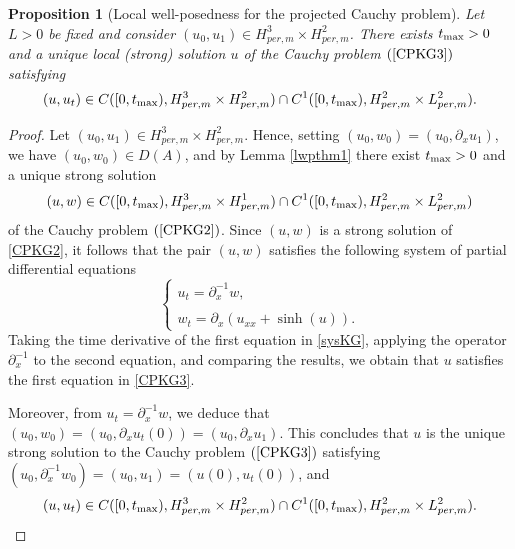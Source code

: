 \documentclass[12pt,reqno,a4paper]{amsart} %
\numberwithin{equation}{section}
\numberwithin{figure}{section}
\newtheorem{proposition}[theorem]{Proposition}
\begin{document}
\begin{proposition}[Local well-posedness for the projected Cauchy problem]\label{lwpthm}
	Let $L>0$ be fixed and consider   $(u_0,u_1)\in H_{per,m}^3\times H_{per,m}^2$. There exists $t_{\rm{max}}>0$ and a unique  local (strong) solution $u$ of the Cauchy problem $(\ref{CPKG3})$ satisfying $$(u,u_t)\in C([0,t_{\rm{max}}),H_{per,m}^3\times H_{per,m}^2)\cap C^1([0,t_{\rm{max}}),H_{per,m}^2\times L_{per,m}^2) .$$ 
\end{proposition}
\begin{proof}
	Let $(u_0,u_1)\in H_{per,m}^3\times H_{per,m}^2$. Hence, setting $(u_0,w_0)=(u_0,\partial_x u_1)$, we have $(u_0,w_0)\in D(A)$, and by Lemma \ref{lwpthm1} there exist $t_{\rm{max}}>0$ and a unique strong solution\noindent $$(u,w)\in C([0,t_{\rm{max}}),H_{per,m}^3\times H_{per,m}^1)\cap C^1([0,t_{\rm{max}}),H_{per,m}^2\times L_{per,m}^2)$$ of the Cauchy problem 
	$(\ref{CPKG2})$. Since $(u,w)$ is a strong solution of \eqref{CPKG2}, it follows that the pair $(u,w)$ satisfies the following system of partial differential equations	
	\begin{equation}\label{sysKG}
		\left\{\begin{array}{llll}u_t=\partial_x^{-1}w,\\\\
			w_t=\partial_x(u_{xx}+\sinh(u)).
		\end{array}\right.
	\end{equation}	
Taking the time derivative of the first equation in \eqref{sysKG}, applying the operator $\partial_x^{-1}$ to the second equation, and comparing the results, we obtain that $u$ satisfies the first equation in \eqref{CPKG3}.

	
	Moreover, from $u_t=\partial_x^{-1}w$, we deduce that  $(u_0,w_0)%
	=(u_0,\partial_xu_t(0))=(u_0,\partial_xu_1)$. This concludes that $u$ is the unique strong solution to the Cauchy problem $(\ref{CPKG3})$ satisfying  $(u_0,\partial_x^{-1}w_0)=(u_0,u_1)=(u(0),u_t(0))$, and $$(u,u_t)\in C([0,t_{\rm{max}}),H_{per,m}^3\times H_{per,m}^2)\cap C^1([0,t_{\rm{max}}),H_{per,m}^2\times L_{per,m}^2).$$ 
\end{proof}
\end{document}
